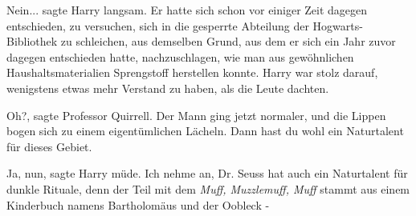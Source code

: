 \glqq Nein...\grqq{} sagte Harry langsam. Er hatte sich schon vor einiger Zeit
dagegen entschieden, zu versuchen, sich in die gesperrte Abteilung der
Hogwarts-Bibliothek zu schleichen, aus demselben Grund, aus dem er sich ein Jahr
zuvor dagegen entschieden hatte, nachzuschlagen, wie man aus gewöhnlichen
Haushaltsmaterialien Sprengstoff herstellen konnte. Harry war stolz darauf,
wenigstens etwas mehr Verstand zu haben, als die Leute dachten.

\glqq Oh?\grqq{}, sagte Professor Quirrell. Der Mann ging jetzt normaler, und
die Lippen bogen sich zu einem eigentümlichen Lächeln. \glqq Dann hast du wohl
ein Naturtalent für dieses Gebiet.\grqq{}

\glqq Ja, nun\grqq{}, sagte Harry müde. \glqq Ich nehme an, Dr. Seuss hat auch
ein Naturtalent für dunkle Rituale, denn der Teil mit dem \emph{Muff,
Muzzlemuff, Muff} stammt aus einem Kinderbuch namens Bartholomäus und der
Oobleck -\grqq{}

